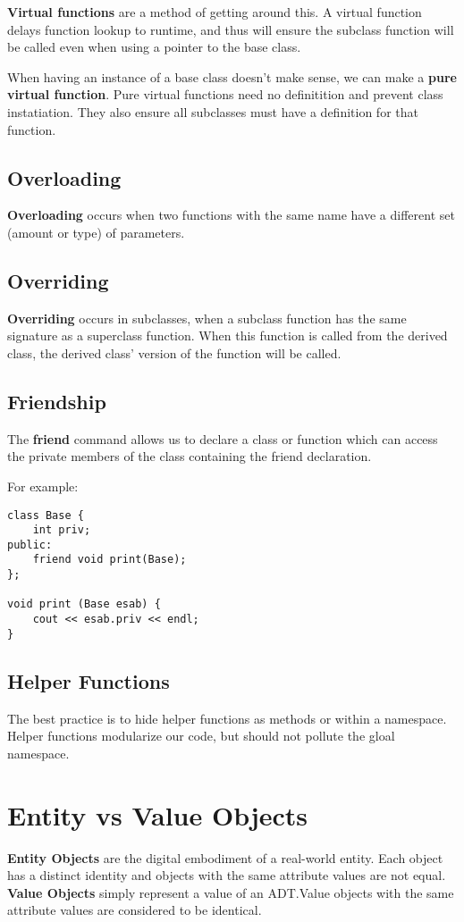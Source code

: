 \documentclass[12pt]{article}
\begin{document}
{\bf Virtual functions} are a method of getting around this. A virtual function delays function lookup to runtime, and thus will ensure the subclass function will be called even when using a pointer to the base class.

When having an instance of a base class doesn't make sense, we can make a {\bf pure virtual function}. Pure virtual functions need no definitition and prevent class instatiation. They also ensure all subclasses must have a definition for that function.

\subsection{Overloading}
{\bf Overloading} occurs when two functions with the same name have a different set (amount or type) of parameters.

\subsection{Overriding}
{\bf Overriding} occurs in subclasses, when a subclass function has the same signature as a superclass function. When this function is called from the derived class, the derived class' version of the function will be called.

\subsection{Friendship}
The {\bf friend} command allows us to declare a class or function which can access the private members of the class containing the friend declaration.

For example:
\begin{verbatim}
class Base {
    int priv;
public:
    friend void print(Base);
};

void print (Base esab) {
    cout << esab.priv << endl;
}
\end{verbatim}

\subsection{Helper Functions}
The best practice is to hide helper functions as  methods or within a namespace. Helper functions modularize our code, but should not pollute the gloal namespace.

\section{Entity vs Value Objects}
{\bf Entity Objects} are the digital embodiment of a real-world entity. Each object has a distinct identity and objects with the same attribute values are not equal. {\bf Value Objects} simply represent a value of an ADT.\@ Value objects with the same attribute values are considered to be identical.
\end{document}
